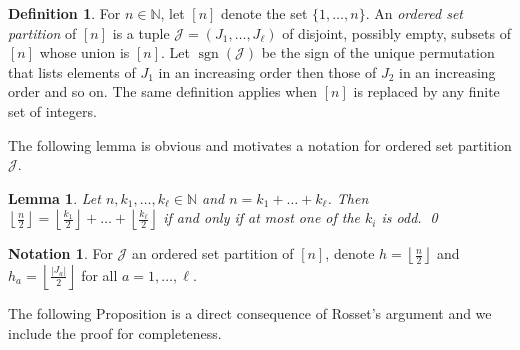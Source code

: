 \documentclass[12pt]{amsart}
\theoremstyle{plain}
\newtheorem{lemma}[theorem]{Lemma}
\theoremstyle{definition}
\newtheorem{definition}[theorem]{Definition}
\newtheorem{notation}[theorem]{Notation}
\numberwithin{equation}{theorem}
\newcommand{\sgn}{\operatorname{sgn}}
\newcommand{\NN}{\mathbb{N}}
\newcommand{\mc}[1]{\mathcal{#1}}
\newcommand{\length}[1]{\left\lvert #1\right\rvert}
\begin{document}
\begin{definition}
    For $n \in \NN$, let $[n]$ denote the set $\{1, \dots, n\}$.
    An \emph{ordered set partition} of $[n]$ is a tuple $\mc{J} = (J_1, \dots, J_\ell)$ of disjoint, possibly empty, subsets of $[n]$ whose union is $[n]$. Let $\sgn(\mc{J})$ be the sign of the unique permutation that lists elements of $J_1$ in an increasing order then those of $J_2$ in an increasing order and so on. The same definition applies when $[n]$ is replaced by any finite set of integers.
\end{definition}
The following lemma is obvious and motivates a notation for ordered set partition $\mc{J}$.
\begin{lemma}\label{lem: easy}
    Let $n, k_1, \dots, k_\ell \in \NN$ and $n = k_1 + \dots + k_\ell$. Then 
    $\left\lfloor \frac{n}{2}\right\rfloor = \left\lfloor \frac{k_1}{2}\right\rfloor + \dots + \left\lfloor \frac{k_\ell}{2}\right\rfloor$
    if and only if at most one of the $k_i$ is odd. 
     \qed
\end{lemma}
\begin{notation}\label{not: h}
    For $\mc{J}$ an ordered set partition of $[n]$, denote $h = \left\lfloor \frac{n}{2} \right\rfloor$ and $h_a = \left\lfloor\frac{\length{J_a}}{2}  \right\rfloor$ for all $a = 1, \dots, \ell$.
\end{notation}


The following Proposition is a direct consequence of Rosset's argument and we include the proof for completeness.
\end{document}
